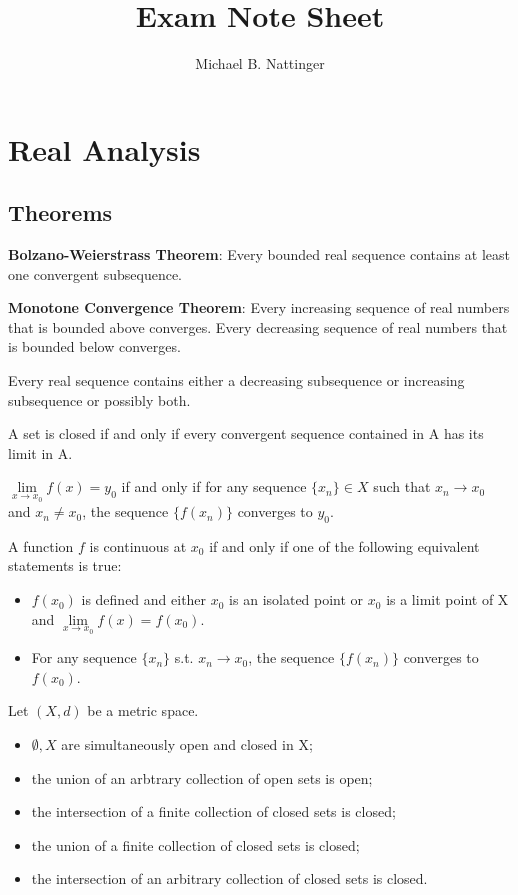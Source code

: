 \documentclass[11pt]{article} %
\title{Exam Note Sheet}
\author{Michael B. Nattinger}
\begin{document}
\maketitle

\section{Real Analysis}
\subsection{Theorems}

\textbf{Bolzano-Weierstrass Theorem}: Every bounded real sequence contains at least one convergent subsequence.

\textbf{Monotone Convergence Theorem}: Every increasing sequence of real numbers that is bounded above converges. Every decreasing sequence of real numbers that is bounded below converges.

Every real sequence contains either a decreasing subsequence or increasing subsequence or possibly both.

A set is closed if and only if every convergent sequence contained in A has its limit in A.

$\lim\limits_{x \rightarrow x_0} f(x) = y_0$ if and only if for any sequence $\{ x_n\} \in X$ such that $x_n \rightarrow x_0$ and $x_n\neq x_0$, the sequence $\{ f(x_n)\}$ converges to $y_0$.

A function $f$ is continuous at $x_0$ if and only if one of the following equivalent statements is true:
\begin{itemize}
\item $f(x_0)$ is defined and either $x_0$ is an isolated point or $x_0$ is a limit point of X and $\lim\limits_{x \rightarrow x_0} f(x) = f(x_0)$.
\item For any sequence $\{ x_n\}$ s.t. $x_n \rightarrow x_0$, the sequence $\{ f(x_n)\}$ converges to $f(x_0)$.
\end{itemize}

Let $(X,d)$ be a metric space.
\begin{itemize}
\item $\emptyset,X$ are simultaneously open and closed in X;
\item the union of an arbtrary collection of open sets is open;
\item the intersection of a finite collection of closed sets is closed;
\item the union of a finite collection of closed sets is closed;
\item the intersection of an arbitrary collection of closed sets is closed.
\end{itemize}
\end{document}
